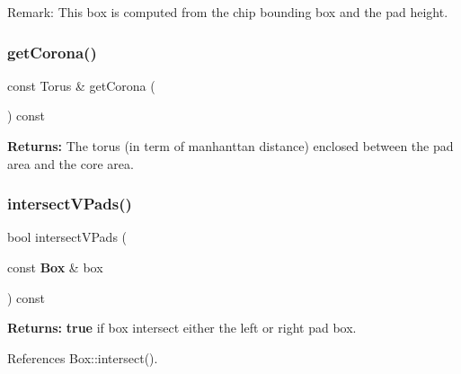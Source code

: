 \begin{DoxyParagraph}{Remark\+:}
This box is computed from the chip bounding box and the pad height. 
\end{DoxyParagraph}
\mbox{\label{classKatabatic_1_1ChipTools_a19c65013cccd38e5d4169fc25454b938}} 
\subsubsection{\texorpdfstring{get\+Corona()}{getCorona()}}
{\footnotesize\ttfamily const Torus \& get\+Corona (\begin{DoxyParamCaption}{ }\end{DoxyParamCaption}) const\hspace{0.3cm}{\ttfamily [inline]}}

{\bfseries Returns\+:} The torus (in term of manhanttan distance) enclosed between the pad area and the core area. \mbox{\label{classKatabatic_1_1ChipTools_a708cdae658a916324059d321fafeaa7d}} 
\subsubsection{\texorpdfstring{intersect\+V\+Pads()}{intersectVPads()}}
{\footnotesize\ttfamily bool intersect\+V\+Pads (\begin{DoxyParamCaption}\item[{const \textbf{ Box} \&}]{box }\end{DoxyParamCaption}) const\hspace{0.3cm}{\ttfamily [inline]}}

{\bfseries Returns\+:} {\bfseries true} if {\ttfamily box} intersect either the left or right pad box. 

References Box\+::intersect().

\mbox{\label{classKatabatic_1_1ChipTools_aeead79862ba27f1219a3cbb3ef6999d2}} 
